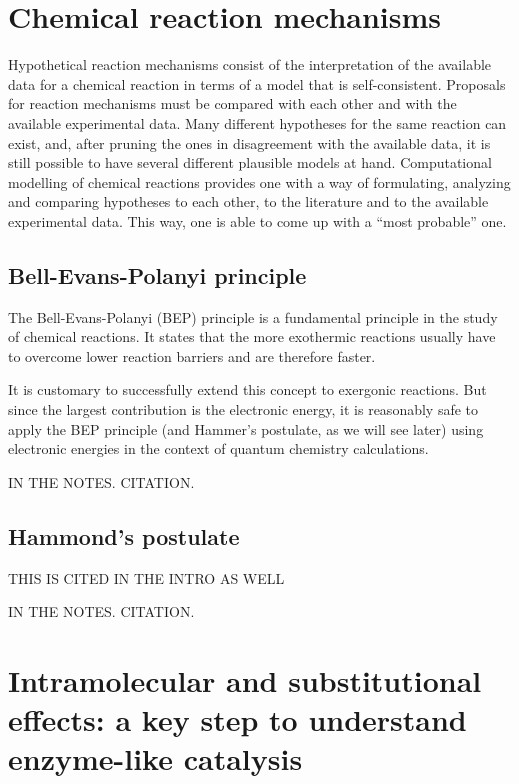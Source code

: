 \section{Chemical reaction mechanisms}

Hypothetical reaction mechanisms consist of
the interpretation of the available data for a chemical reaction
in terms of a model that is self-consistent.
Proposals for reaction mechanisms must be compared
with each other
and with the available experimental data.
Many different hypotheses for the same reaction can exist,
and,
after pruning the ones in disagreement with the available data,
it is still possible to have several different plausible models at hand.
Computational modelling of chemical reactions
provides one with a way of
formulating,
analyzing and
comparing hypotheses to each other,
to the literature and to the available experimental data.
This way,
one is able to come up with a ``most probable'' one.

\subsection{Bell-Evans-Polanyi principle}

The Bell-Evans-Polanyi (BEP) principle is a fundamental principle in the study
of chemical reactions.
It states that the more exothermic reactions usually have to overcome lower
reaction barriers and are therefore faster.


It is customary to successfully extend this concept to exergonic reactions.
But since the largest contribution is the electronic energy,
it is reasonably
safe to apply the BEP principle (and Hammer's postulate,
as we will see later)
using electronic energies in the context of quantum chemistry calculations.

IN THE NOTES.\@
CITATION.\@

\subsection{Hammond's postulate}

THIS IS CITED IN THE INTRO AS WELL

IN THE NOTES.\@
CITATION.\@

\section{Intramolecular and substitutional effects:
  a key step to understand enzyme-like catalysis}


